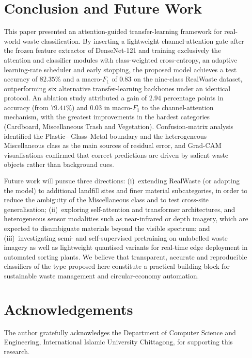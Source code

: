\documentclass[a4paper,fleqn]{cas-dc}
\begin{document}
\section{Conclusion and Future Work}\label{sec:conclusion}

This paper presented an attention-guided transfer-learning framework for
real-world waste classification. By inserting a lightweight channel-attention
gate after the frozen feature extractor of DenseNet-121 and training
exclusively the attention and classifier modules with class-weighted
cross-entropy, an adaptive learning-rate scheduler and early stopping, the
proposed model achieves a test accuracy of $82.35\%$ and a macro-$F_1$ of
$0.83$ on the nine-class RealWaste dataset, outperforming six alternative
transfer-learning backbones under an identical protocol. An ablation study
attributed a gain of $2.94$ percentage points in accuracy (from $79.41\%$)
and $0.03$ in macro-$F_1$ to the channel-attention mechanism, with the
greatest improvements in the hardest categories (Cardboard, Miscellaneous
Trash and Vegetation). Confusion-matrix analysis identified the Plastic--
Glass--Metal boundary and the heterogeneous Miscellaneous class as the
main sources of residual error, and Grad-CAM visualisations confirmed that
correct predictions are driven by salient waste objects rather than
background cues.

Future work will pursue three directions: (i)~extending RealWaste (or
adapting the model) to additional landfill sites and finer material
subcategories, in order to reduce the ambiguity of the Miscellaneous class
and to test cross-site generalisation; (ii)~exploring self-attention and
transformer architectures, and heterogeneous sensor modalities such as
near-infrared or depth imagery, which are expected to disambiguate
materials beyond the visible spectrum; and (iii)~investigating semi-
and self-supervised pretraining on unlabelled waste imagery as well as
lightweight quantised variants for real-time edge deployment in automated
sorting plants. We believe that transparent, accurate and reproducible
classifiers of the type proposed here constitute a practical building block
for sustainable waste management and circular-economy automation.

\section*{Acknowledgements}
The author gratefully acknowledges the Department of Computer Science and
Engineering, International Islamic University Chittagong, for supporting
this research.

\bigskip
\printcredits



\end{document}
